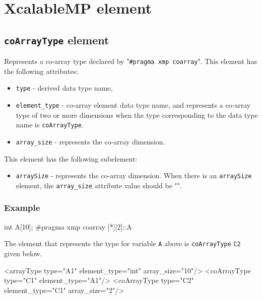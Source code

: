 \section{XcalableMP element}


\subsection{ {\tt coArrayType} element}

Represents a co-array type declared by "{\tt \#pragma xmp coarray}". This element has the following attributes:

\begin{itemize}
\item {\tt type} - derived data type name,
\item {\tt element\_type} - co-array element data type name, and
      represents a co-array type of two or more dimensions when the type corresponding to the data type name is {\tt coArrayType}.
\item {\tt array\_size} - represents the co-array dimension.
\end{itemize}

This element has the following subelement:

\begin{itemize}
\item {\tt arraySize} - represents the co-array dimension.
      When there is an {\tt arraySize} element, the {\tt array\_size} attribute value should be "{\tt *}". 
\end{itemize}

\subsubsection*{Example}
\vspace{1mm}

\begin{CExample}
int A[10];
#pragma xmp coarray [*][2]::A
\end{CExample}

The element that represents the type for variable {\tt A} above is {\tt coArrayType} {\tt C2} given below.
\vspace{2mm}

\begin{XcodeMLExample}
<arrayType type="A1" element_type="int" array_size="10"/>
<coArrayType type="C1" element_type="A1"/>
<coArrayType type="C2" element_type="C1" array_size="2"/>
\end{XcodeMLExample}


